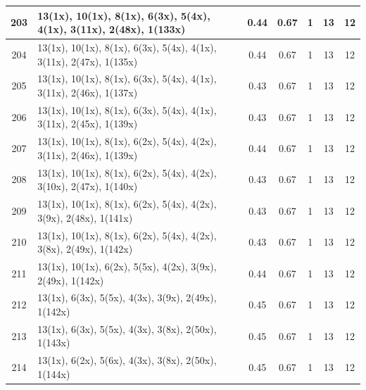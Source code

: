 \begin{small}
\begin{longtable}{|c|p{4cm}|c|c|c|c|c|}
  203 & 13(1x), 10(1x), 8(1x), 6(3x), 5(4x), 4(1x), 3(11x), 2(48x), 1(133x) & \cellcolor{colorGood}  0.44 & \cellcolor{colorGood} 0.67 & 1 & 13 & \cellcolor{colorGood} 12 \\   \hline
  204 & 13(1x), 10(1x), 8(1x), 6(3x), 5(4x), 4(1x), 3(11x), 2(47x), 1(135x) & \cellcolor{colorGood}  0.44 & \cellcolor{colorGood} 0.67 & 1 & 13 & \cellcolor{colorGood} 12 \\   \hline
  205 & 13(1x), 10(1x), 8(1x), 6(3x), 5(4x), 4(1x), 3(11x), 2(46x), 1(137x) & \cellcolor{colorGood}  0.43 & \cellcolor{colorGood} 0.67 & 1 & 13 & \cellcolor{colorGood} 12 \\   \hline
  206 & 13(1x), 10(1x), 8(1x), 6(3x), 5(4x), 4(1x), 3(11x), 2(45x), 1(139x) & \cellcolor{colorGood}  0.43 & \cellcolor{colorGood} 0.67 & 1 & 13 & \cellcolor{colorGood} 12 \\   \hline
  207 & 13(1x), 10(1x), 8(1x), 6(2x), 5(4x), 4(2x), 3(11x), 2(46x), 1(139x) & \cellcolor{colorGood}  0.44 & \cellcolor{colorGood} 0.67 & 1 & 13 & \cellcolor{colorGood} 12 \\   \hline
  208 & 13(1x), 10(1x), 8(1x), 6(2x), 5(4x), 4(2x), 3(10x), 2(47x), 1(140x) & \cellcolor{colorGood}  0.43 & \cellcolor{colorGood} 0.67 & 1 & 13 & \cellcolor{colorGood} 12 \\   \hline
  209 & 13(1x), 10(1x), 8(1x), 6(2x), 5(4x), 4(2x), 3(9x), 2(48x), 1(141x) & \cellcolor{colorGood}  0.43 & \cellcolor{colorGood} 0.67 & 1 & 13 & \cellcolor{colorGood} 12 \\   \hline
  210 & 13(1x), 10(1x), 8(1x), 6(2x), 5(4x), 4(2x), 3(8x), 2(49x), 1(142x) & \cellcolor{colorGood}  0.43 & \cellcolor{colorGood} 0.67 & 1 & 13 & \cellcolor{colorGood} 12 \\   \hline
  211 & 13(1x), 10(1x), 6(2x), 5(5x), 4(2x), 3(9x), 2(49x), 1(142x) & \cellcolor{colorGood}  0.44 & \cellcolor{colorGood} 0.67 & 1 & 13 & \cellcolor{colorGood} 12 \\   \hline
  212 & 13(1x), 6(3x), 5(5x), 4(3x), 3(9x), 2(49x), 1(142x) & \cellcolor{colorGood}  0.45 & \cellcolor{colorGood} 0.67 & 1 & 13 & \cellcolor{colorGood} 12 \\   \hline
  213 & 13(1x), 6(3x), 5(5x), 4(3x), 3(8x), 2(50x), 1(143x) & \cellcolor{colorGood}  0.45 & \cellcolor{colorGood} 0.67 & 1 & 13 & \cellcolor{colorGood} 12 \\   \hline
  214 & 13(1x), 6(2x), 5(6x), 4(3x), 3(8x), 2(50x), 1(144x) & \cellcolor{colorGood}  0.45 & \cellcolor{colorGood} 0.67 & 1 & 13 & \cellcolor{colorGood} 12 \\   \hline

\end{longtable}
\end{small}
